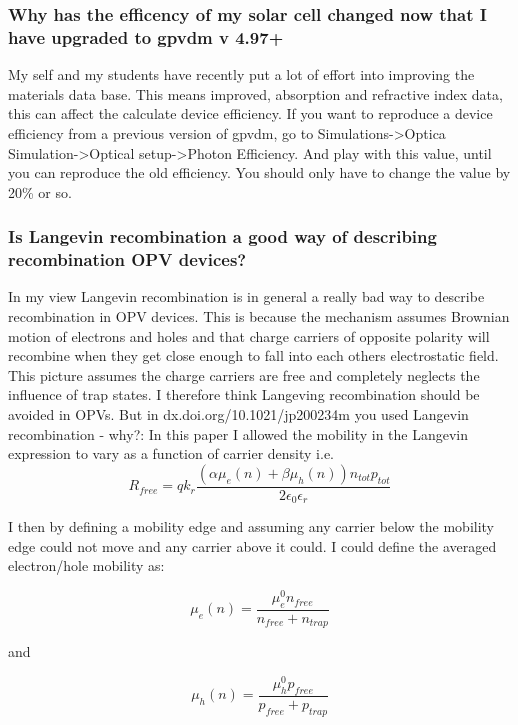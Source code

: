 \documentclass[11pt]{article}
\begin{document}
\subsubsection{Why has the efficency of my solar cell changed now that I have upgraded to gpvdm v 4.97+}
My self and my students have recently put a lot of effort into improving the materials data base.  This means improved, absorption and refractive index data, this can affect the calculate device efficiency.  If you want to reproduce a device efficiency from a previous version of gpvdm, go to Simulations->Optica Simulation->Optical setup->Photon Efficiency. And play with this value, until you can reproduce the old efficiency.  You should only have to change the value by 20\% or so.

\subsubsection{Is Langevin recombination a good way of describing recombination OPV devices?}
In my view Langevin recombination is in general a really bad way to describe recombination in OPV devices.  This is because the mechanism assumes Brownian motion of electrons and holes and that charge carriers of opposite polarity will recombine when they get close enough to fall into each others electrostatic field.  This picture assumes the charge carriers are free and completely neglects the influence of trap states.  I therefore think Langeving recombination should be avoided in OPVs.
But in dx.doi.org/10.1021/jp200234m you used Langevin recombination - why?: In this paper I allowed the mobility in the Langevin expression to vary as a function of carrier density i.e.
\begin{equation}
R_{free}=q k_{r}\frac{(\alpha \mu_e(n)+\beta \mu_h(n)) n_{tot} p_{tot}}{2\epsilon_0\epsilon_r}
\end{equation}

I then by defining a mobility edge and assuming any carrier below the mobility edge could not move and any carrier above it could.  I could define the averaged electron/hole mobility as: 

\begin{equation}
\mu_e(n)=\frac{\mu_e^0 n_{free}}{n_{free}+n_{trap}}
\end{equation}

and

\begin{equation}
\mu_h(n)=\frac{\mu_h^0 p_{free}}{p_{free}+p_{trap}}
\end{equation}
\end{document}
